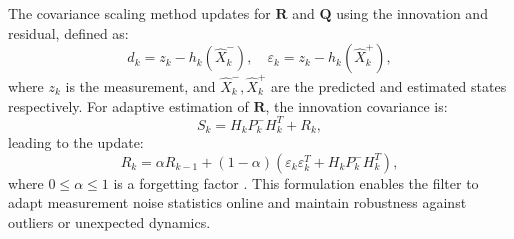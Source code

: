 \documentclass[conference,10pt,a4paper]{IEEEtran}%
\begin{document}
The covariance scaling method updates for $\mathbf{R}$ and $\mathbf{Q}$ using the innovation and residual, defined as:                                        
\begin{equation}
  d_k = z_k - h_k(\hat{X}^-_k), \quad \varepsilon_k = z_k - h_k(\hat{X}^+_k),
\end{equation}                                                                                                                                          
where $z_k$ is the measurement, and $\hat{X}^-_k, \hat{X}^+_k$ are the predicted and estimated states respectively. For adaptive estimation of $\mathbf{R}$, the innovation covariance is:                                                                                                               
\begin{equation}                                               
  S_k = H_k P^-_k H_k^T + R_k,                                 
\end{equation}                                              
leading to the update:
\begin{equation}                                               
  R_k = \alpha R_{k-1} + (1-\alpha)(\varepsilon_k \varepsilon_k^T + H_k P^-_k H_k^T),
\end{equation}                                                 
where $0 \leq \alpha \leq 1$ is a forgetting factor \cite{Akhlaghi2018}. This formulation enables the filter to adapt measurement noise statistics online and maintain robustness against outliers or unexpected dynamics.                                                                 
                 
\end{document}
